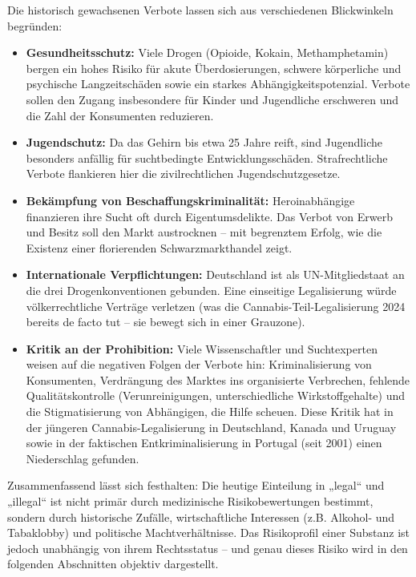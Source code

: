\documentclass[11pt,a4paper]{article}
\begin{document}
	Die historisch gewachsenen Verbote lassen sich aus verschiedenen Blickwinkeln begründen:
	
	\begin{itemize}[leftmargin=*, noitemsep]
		\item \textbf{Gesundheitsschutz:} Viele Drogen (Opioide, Kokain, Methamphetamin) bergen ein hohes Risiko für akute Überdosierungen, schwere körperliche und psychische Langzeitschäden sowie ein starkes Abhängigkeitspotenzial. Verbote sollen den Zugang insbesondere für Kinder und Jugendliche erschweren und die Zahl der Konsumenten reduzieren.
		\item \textbf{Jugendschutz:} Da das Gehirn bis etwa 25 Jahre reift, sind Jugendliche besonders anfällig für suchtbedingte Entwicklungsschäden. Strafrechtliche Verbote flankieren hier die zivilrechtlichen Jugendschutzgesetze.
		\item \textbf{Bekämpfung von Beschaffungskriminalität:} Heroinabhängige finanzieren ihre Sucht oft durch Eigentumsdelikte. Das Verbot von Erwerb und Besitz soll den Markt austrocknen – mit begrenztem Erfolg, wie die Existenz einer florierenden Schwarzmarkthandel zeigt.
		\item \textbf{Internationale Verpflichtungen:} Deutschland ist als UN-Mitgliedstaat an die drei Drogenkonventionen gebunden. Eine einseitige Legalisierung würde völkerrechtliche Verträge verletzen (was die Cannabis-Teil-Legalisierung 2024 bereits de facto tut – sie bewegt sich in einer Grauzone).
		\item \textbf{Kritik an der Prohibition:} Viele Wissenschaftler und Suchtexperten weisen auf die negativen Folgen der Verbote hin: Kriminalisierung von Konsumenten, Verdrängung des Marktes ins organisierte Verbrechen, fehlende Qualitätskontrolle (Verunreinigungen, unterschiedliche Wirkstoffgehalte) und die Stigmatisierung von Abhängigen, die Hilfe scheuen. Diese Kritik hat in der jüngeren Cannabis-Legalisierung in Deutschland, Kanada und Uruguay sowie in der faktischen Entkriminalisierung in Portugal (seit 2001) einen Niederschlag gefunden.
	\end{itemize}
	
	Zusammenfassend lässt sich festhalten: Die heutige Einteilung in „legal“ und „illegal“ ist nicht primär durch medizinische Risikobewertungen bestimmt, sondern durch historische Zufälle, wirtschaftliche Interessen (z.B. Alkohol- und Tabaklobby) und politische Machtverhältnisse. Das Risikoprofil einer Substanz ist jedoch unabhängig von ihrem Rechtsstatus – und genau dieses Risiko wird in den folgenden Abschnitten objektiv dargestellt.
	
\end{document}
